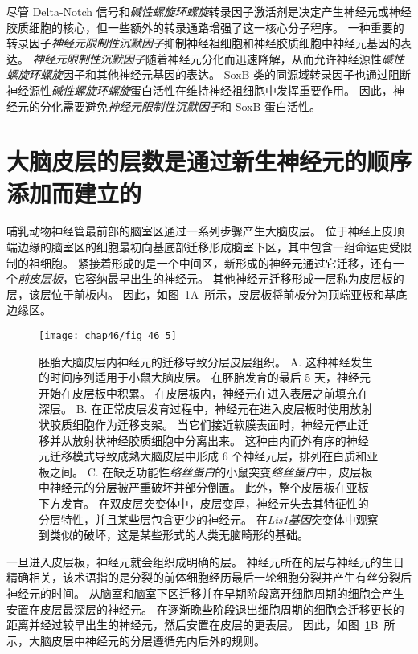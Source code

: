 尽管 Delta-Notch 信号和\textit{碱性螺旋环螺旋}转录因子激活剂是决定产生神经元或神经胶质细胞的核心，但一些额外的转录通路增强了这一核心分子程序。
一种重要的转录因子\textit{神经元限制性沉默因子}抑制神经祖细胞和神经胶质细胞中神经元基因的表达。
\textit{神经元限制性沉默因子}随着神经元分化而迅速降解，从而允许神经源性\textit{碱性螺旋环螺旋}因子和其他神经元基因的表达。
SoxB 类的同源域转录因子也通过阻断神经源性\textit{碱性螺旋环螺旋}蛋白活性在维持神经祖细胞中发挥重要作用。
因此，神经元的分化需要避免\textit{神经元限制性沉默因子}和 SoxB 蛋白活性。



\section{大脑皮层的层数是通过新生神经元的顺序添加而建立的}

哺乳动物神经管最前部的脑室区通过一系列步骤产生大脑皮层。
位于神经上皮顶端边缘的脑室区的细胞最初向基底部迁移形成脑室下区，其中包含一组命运更受限制的祖细胞。
紧接着形成的是一个中间区，新形成的神经元通过它迁移，还有一个\textit{前皮层板}，它容纳最早出生的神经元。
其他神经元迁移形成一层称为皮层板的层，该层位于前板内。
因此，如图~\ref{fig:46_5}A~所示，皮层板将前板分为顶端亚板和基底边缘区。


\begin{figure}[htbp]
	\centering
	\texttt{[image: chap46/fig\_46\_5]}
	\caption{胚胎大脑皮层内神经元的迁移导致分层皮层组织\cite{olson2002smooth}。
		A. 这种神经发生的时间序列适用于小鼠大脑皮层。
		在胚胎发育的最后 5 天，神经元开始在皮层板中积累。
		在皮层板内，神经元在进入表层之前填充在深层。 
		B. 在正常皮层发育过程中，神经元在进入皮层板时使用放射状胶质细胞作为迁移支架。
		当它们接近软膜表面时，神经元停止迁移并从放射状神经胶质细胞中分离出来。
		 这种由内而外有序的神经元迁移模式导致成熟大脑皮层中形成 6 个神经元层，排列在白质和亚板之间。
		C. 在缺乏功能性\textit{络丝蛋白}的小鼠突变\textit{络丝蛋白}中，皮层板中神经元的分层被严重破坏并部分倒置。
		此外，整个皮层板在亚板下方发育。
		在双皮层突变体中，皮层变厚，神经元失去其特征性的分层特性，并且某些层包含更少的神经元。
		在\textit{Lis1基因}突变体中观察到类似的破坏，这是某些形式的人类无脑畸形的基础。}
	\label{fig:46_5}
\end{figure}


一旦进入皮层板，神经元就会组织成明确的层。
神经元所在的层与神经元的生日精确相关，该术语指的是分裂的前体细胞经历最后一轮细胞分裂并产生有丝分裂后神经元的时间。
从脑室和脑室下区迁移并在早期阶段离开细胞周期的细胞会产生安置在皮层最深层的神经元。
在逐渐晚些阶段退出细胞周期的细胞会迁移更长的距离并经过较早出生的神经元，然后安置在皮层的更表层。
因此，如图~\ref{fig:46_5}B~所示，大脑皮层中神经元的分层遵循先内后外的规则。



